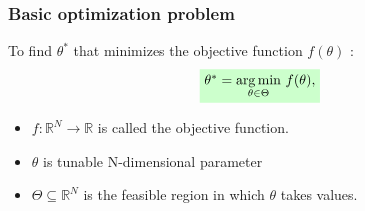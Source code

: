 



%
%


\begin{frame}
\frametitle{\centering Basic optimization problem}
\begin{block}{}
\begin{small}
To find $\theta^{*}$ that minimizes the objective function $f(\theta)$ :
\begin{align}\label{eq:opt}
\tikz[baseline]{\node[fill=green!20,anchor=base] (tL) {$ \theta^* = \underset{\theta \in \Theta}{\argmin} ~f(\theta),$};}
\end{align}
\end{small}
\end{block}
\begin{small}
\begin{itemize}
\item $f \colon \mathbb{R}^N \to \mathbb{R}$ is called the \alert{objective function}.
\item $\theta$ is tunable N-dimensional parameter
\item $\Theta \subseteq \mathbb{R}^N$ is the \alert{feasible region} in which $\theta$ takes values.
\end{itemize}
\end{small}
\end{frame}

